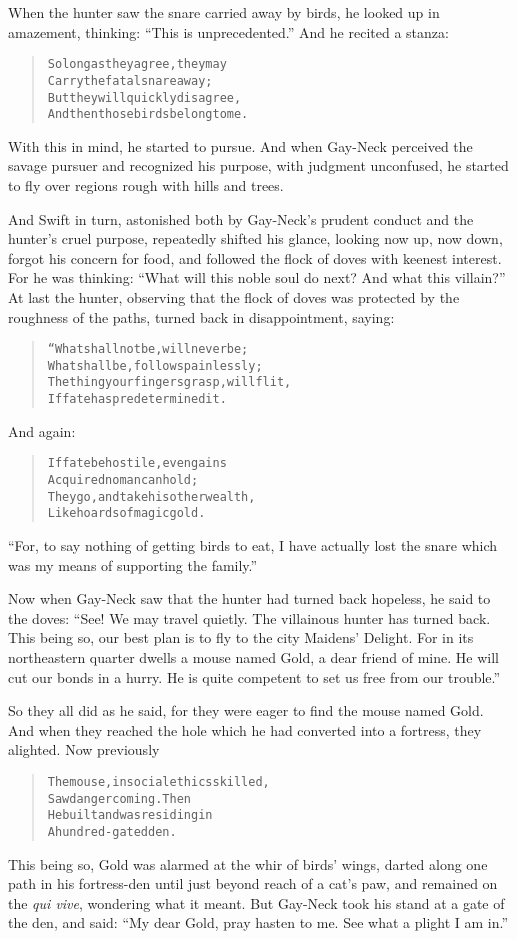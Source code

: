 \documentclass[article, twoside, 14pt]{memoir}
\renewenvironment{verbatim}{%
\begin{quote}%
\vskip -10pt%
\begin{alltt}\normalfont\large}{\end{alltt}%
\end{quote}%
\vskip -10pt
} %
\begin{document}
When the hunter saw the snare carried away by birds, he looked up
in amazement, thinking: ``This is unprecedented.'' And he recited a
stanza:

\begin{verbatim}
So long as they agree, they may
Carry the fatal snare away;
But they will quickly disagree,
And then those birds belong to me.
\end{verbatim}
With this in mind, he started to pursue. And when Gay-Neck
perceived the savage pursuer and recognized his purpose, with
judgment unconfused, he started to fly over regions rough with
hills and trees.

And Swift in turn, astonished both by Gay-Neck's prudent conduct
and the hunter's cruel purpose, repeatedly shifted his glance,
looking now up, now down, forgot his concern for food, and followed
the flock of doves with keenest interest. For he was thinking:
``What will this noble soul do next? And what this villain?'' At
last the hunter, observing that the flock of doves was protected by
the roughness of the paths, turned back in disappointment, saying:

\begin{verbatim}
“What shall not be, will never be;
What shall be, follows painlessly;
The thing your fingers grasp, will flit,
If fate has predetermined it.
\end{verbatim}
And again:

\begin{verbatim}
If fate be hostile, even gains
Acquired no man can hold;
They go, and take his other wealth,
Like hoards of magic gold.
\end{verbatim}
``For, to say nothing of getting birds to eat, I have actually lost the snare which was my means of supporting the family.''

Now when Gay-Neck saw that the hunter had turned back hopeless, he
said to the doves:
``See! We may travel quietly. The villainous hunter has turned back. This being so, our best plan is to fly to the city Maidens' Delight. For in its northeastern quarter dwells a mouse named Gold, a dear friend of mine. He will cut our bonds in a hurry. He is quite competent to set us free from our trouble.''

So they all did as he said, for they were eager to find the mouse
named Gold. And when they reached the hole which he had converted
into a fortress, they alighted. Now previously

\begin{verbatim}
The mouse, in social ethics skilled,
    Saw danger coming. Then
He built and was residing in
    A hundred-gated den.
\end{verbatim}
This being so, Gold was alarmed at the whir of birds' wings, darted
along one path in his fortress-den until just beyond reach of a
cat's paw, and remained on the \emph{qui vive}, wondering what it
meant. But Gay-Neck took his stand at a gate of the den, and said:
``My dear Gold, pray hasten to me. See what a plight I am in.''
\end{document}
